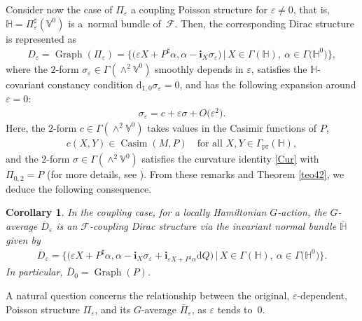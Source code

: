 \documentclass[pdftex]{sigma}
\numberwithin{equation}{section}
\newtheorem{Corollary}[Theorem]{Corollary}
\begin{document}
Consider now the case of $\Pi_{\varepsilon}$ a coupling Poisson structure for $\varepsilon\neq0$, that is, $\mathbb{H}= \Pi_{\varepsilon}^{\sharp}(\mathbb{V}^{0})$ is a~normal bundle of~$\mathcal{F}$. Then, the corresponding Dirac structure is represented as
\begin{gather*}
D_{\varepsilon}=\operatorname*{Graph}(\Pi_{\varepsilon})=\big\{\big(\varepsilon
X+P^{\sharp}\alpha,\alpha-\mathbf{i}_{X}\sigma_{\varepsilon}\big)\,|\, X\in \Gamma(\mathbb{H}),\ \alpha\in\Gamma\big(\mathbb{H}^{0}\big)\big\},
\end{gather*}
where the $2$-form $\sigma_{\varepsilon}\in\Gamma(\wedge^{2}\mathbb{V}^{0})$ smoothly depends in $\varepsilon$, satisf\/ies the $\mathbb{H}$-covariant constancy condition $\mathrm{d}_{1,0}\sigma_{\varepsilon}=0$, and has the following expansion around $\varepsilon=0$:
\begin{gather*}%
\sigma_{\varepsilon}=c+\varepsilon\sigma+O\big(\varepsilon^{2}\big).
\end{gather*}
Here, the $2$-form $c\in\Gamma(\wedge^{2}\mathbb{V}^{0})$ takes values in the Casimir functions of $P$,
\begin{gather*}
c(X,Y)\in\operatorname*{Casim}(M,P)\quad \mbox{for all }X,Y\in\Gamma_{\operatorname*{pr}}(\mathbb{H}),
\end{gather*}
and the $2$-form $\sigma\in\Gamma(\wedge^{2}\mathbb{V}^{0})$ satisf\/ies the curvature identity \eqref{Cur} with $\Pi_{0,2}=P$ (for more details, see \cite{Va-04,JVYV-14}). From these remarks and Theorem \ref{teo42}, we deduce the following consequence.

\begin{Corollary}
In the coupling case, for a locally Hamiltonian $G$-action, the $G$-average $\overline{D}_{\varepsilon}$ is an $\mathcal{F}$-coupling Dirac structure via the invariant normal bundle $\mathbb{\bar{H}}$ given by
\begin{gather*}
\overline{D}_{\varepsilon}=\big\{\big(\varepsilon X+P^{\sharp}\alpha,\alpha-\mathbf{i}
_{X}\sigma_{\varepsilon}+\mathbf{i}_{\varepsilon X+P^{\sharp}\alpha}\mathrm{d}Q\big)\,|\,
X\in\Gamma(\mathbb{H}),\ \alpha\in\Gamma\big(\mathbb{H}^{0}\big)\big\}.
\end{gather*}
In particular, $\overline{D}_{0}=\operatorname*{Graph}(P)$.
\end{Corollary}

A natural question concerns the relationship between the original, $\varepsilon$-dependent, Poisson structure $\Pi_{\varepsilon}$, and its $G$-average $\overline{\Pi}_{\varepsilon}$, as $\varepsilon$ tends to~$0$.
\end{document}
